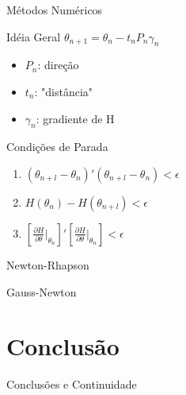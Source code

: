 \documentclass{beamer}
\begin{document}
\begin{frame}{Métodos Numéricos}
\begin{block}{Idéia Geral}
$ \theta_{n+1} = \theta_{n} - t_{n}P_{n}\gamma_{n} $

\begin{itemize}
\item $P_{n}$: direção
\item $t_{n}$: "distância"
\item $\gamma_{n}$: gradiente de H
\end{itemize}
\end{block}
\begin{block}{Condições de Parada}
\begin{enumerate}
\item $ ( \theta_{n+l} - \theta_n )'( \theta_{n+l} - \theta_n ) < \epsilon$
\item $ H(  \theta_n )- H (\theta_{n+l} ) < \epsilon$
\item $  [\frac{\partial H}{\partial \theta}\vert_{\theta_n}]'[\frac{\partial H}{\partial \theta}\vert_{\theta_n}] < \epsilon$
\end{enumerate}
\end{block}

\end{frame}

\begin{frame}{Newton-Rhapson}

\end{frame}

\begin{frame}{Gauss-Newton}
\end{frame}

\begin{frame}
\begin{center}
\end{center}
\end{frame}

\section{Conclusão}

\begin{frame}{Conclusões e Continuidade}
\end{frame}
\end{document}
